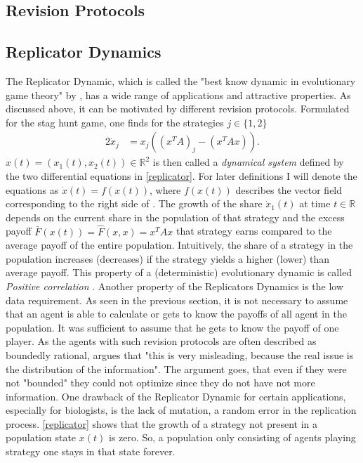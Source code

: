 \documentclass[12pt]{article}
\newcommand{\realnumb}{\mathbb{R}}
\begin{document}
\subsection{Revision Protocols}


\subsection{Replicator Dynamics}
The Replicator Dynamic, which is called the "best know dynamic in
evolutionary game theory" by \cite{Sandholm}, has a wide range of applications
and attractive properties. As discussed above, it can be motivated by 
different revision protocols. Formulated for the stag hunt game, one finds for
the strategies $j \in \{1,2\}$
\begin{alignat}{2}
        \dot{x}_j &= x_j\left(\left(x^T A\right)_j - \left(x^T A x\right)\right) 
        \label{replicator}.
\end{alignat}
$x(t)=(x_1(t), x_2(t)) \in \realnumb^2$ is then called a \textit{dynamical
system} defined by the two differential equations in \eqref{replicator}. For
later definitions I will denote the equations as $\dot{x}(t) = f(x(t))$, where
$f(x(t))$ describes the vector field corresponding to the right side of
\label{replicator}. 
The growth of the share $\dot{x}_1(t)$ at time $t \in \realnumb$ depends on the current share in the
population of that strategy and the excess payoff $\bar{F}(x(t)) 
= \hat{F}(x,x) = x^T A x$ that strategy earns 
compared to the average payoff of the entire population. Intuitively, the
share of a strategy in the population increases (decreases) if the strategy
yields a higher (lower) than average payoff. This property of a (deterministic)
evolutionary dynamic is called \textit{Positive correlation} \cite{sandholm}.
Another property of the Replicators Dynamics is the low data requirement. As 
seen in the previous section, it is not necessary to assume that an agent
is able to calculate or gets to know the payoffs of all agent in the population.
It was sufficient to assume that he gets to know the payoff of one player. 
As the agents with such revision protocols are often described as boundedly
rational, \cite{gintis} argues that "this is very misleading, because the real 
issue is the distribution of the information". The argument goes, that even
if they were not "bounded" they could not optimize since they do not have
not more information. 
One drawback of the Replicator Dynamic for certain applications, especially
for biologists, is the lack of mutation, a random error in the replication 
process.
\eqref{replicator} shows that the growth of a strategy not present in a 
population state $x(t)$ is zero. So, a population only consisting of agents
playing strategy one stays in that state forever. 
\end{document}
